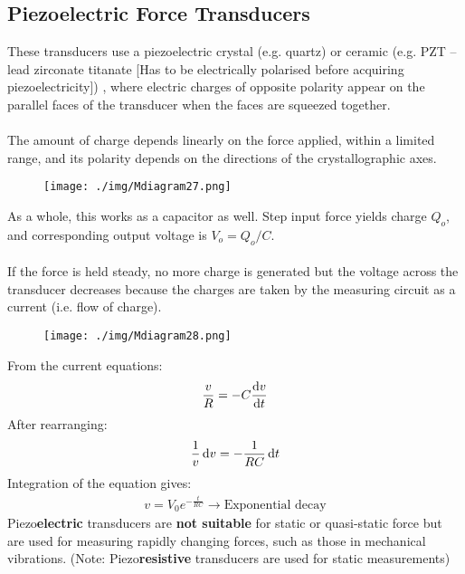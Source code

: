 \subsection{Piezoelectric Force Transducers}
These transducers use a piezoelectric crystal (e.g. quartz) or ceramic (e.g. PZT – lead zirconate titanate [Has to be electrically polarised before acquiring piezoelectricity]) , where electric charges of opposite polarity appear on the parallel faces of the transducer when the faces are squeezed together. \\\\
The amount of charge depends linearly on the force applied, within a limited range, and its polarity depends on the directions of the crystallographic axes.
\begin{figure}[H]
  \centering
  \texttt{[image: ./img/Mdiagram27.png]}
\end{figure}
As a whole, this works as a capacitor as well. Step input force yields charge $Q_o$, and corresponding output voltage is $V_o = Q_o/C$. \\\\
If the force is held steady, no more charge is generated but the voltage across the transducer decreases because the charges are taken by the measuring circuit as a current (i.e. flow of charge).
\begin{figure}[H]
  \centering
  \texttt{[image: ./img/Mdiagram28.png]}
\end{figure}
From the current equations:
\begin{gather}
  \frac{v}{R} = -C\frac{\dif v}{\dif t}
\end{gather}
After rearranging:
\begin{gather}
  \frac{1}{v}\dif v = -\frac{1}{RC}\dif t
\end{gather}
Integration of the equation gives:
\begin{gather}
  v=V_0e^{-\frac{t}{RC}} \longrightarrow \text{Exponential decay}
\end{gather}
Piezo\textbf{electric} transducers are \textbf{not suitable} for static or quasi-static force but are used for measuring rapidly changing forces, such as those in mechanical vibrations. (Note: Piezo\textbf{resistive} transducers are used for static measurements)
